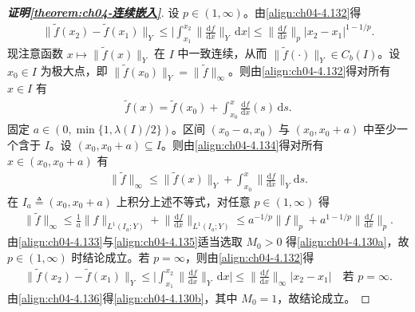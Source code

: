 \documentclass[../../main.tex]{subfiles}%
\begin{document}
\begin{proof}[\textbf{证明\cref{theorem:ch04-连续嵌入}}]
设 $p\in(1,\infty)$。由\eqref{align:ch04-4.132}得
\begin{align}
\|\tilde f(x_2)-\tilde f(x_1)\|_Y\leqslant\Big|\int_{x_1}^{x_2}\Big\|\frac{\mathrm{d}f}{\mathrm{d}x}\Big\|_Y\,\mathrm{d}x\Big|
\leqslant\Big\|\frac{\mathrm{d}f}{\mathrm{d}x}\Big\|_p|x_2-x_1|^{1-1/p}. \label{align:ch04-4.133}
\end{align}
现注意函数 $x\mapsto\|\tilde f(x)\|_Y$ 在 $I$ 中一致连续，从而 $\|\tilde f(\cdot)\|_Y\in C_b(I)$。设 $x_0\in I$ 为极大点，即 $\|\tilde f(x_0)\|_Y=\|\tilde f\|_\infty$。则由\eqref{align:ch04-4.132}得对所有 $x\in I$ 有
\begin{align}
\tilde f(x)=\tilde f(x_0)+\int_{x_0}^{x}\frac{\mathrm{d}f}{\mathrm{d}x}(s)\,\mathrm{d}s. \label{align:ch04-4.134}
\end{align}
固定 $a\in(0,\min\{1,\lambda(I)/2\})$。区间 $(x_0-a,x_0)$ 与 $(x_0,x_0+a)$ 中至少一个含于 $I$。设 $(x_0,x_0+a)\subseteq I$。则由\eqref{align:ch04-4.134}得对所有 $x\in(x_0,x_0+a)$ 有
\begin{align*}
\|\tilde f\|_\infty\leqslant\|\tilde f(x)\|_Y+\int_{x_0}^{x}\Big\|\frac{\mathrm{d}f}{\mathrm{d}x}\Big\|_Y\mathrm{d}s.
\end{align*}
在 $I_a\triangleq(x_0,x_0+a)$ 上积分上述不等式，对任意 $p\in(1,\infty)$ 得
\begin{align}
\|\tilde f\|_\infty\leqslant\frac1a\|f\|_{L^1(I_a;Y)}+\Big\|\frac{\mathrm{d}f}{\mathrm{d}x}\Big\|_{L^1(I_a;Y)}
\leqslant a^{-1/p}\|f\|_p+a^{1-1/p}\Big\|\frac{\mathrm{d}f}{\mathrm{d}x}\Big\|_p. \label{align:ch04-4.135}
\end{align}
由\eqref{align:ch04-4.133}与\eqref{align:ch04-4.135}适当选取 $M_0>0$ 得\eqref{align:ch04-4.130a}，故 $p\in(1,\infty)$ 时结论成立。若 $p=\infty$，则由\eqref{align:ch04-4.132}得
\begin{align}
\|\tilde f(x_2)-\tilde f(x_1)\|_Y\leqslant\Big|\int_{x_1}^{x_2}\Big\|\frac{\mathrm{d}f}{\mathrm{d}x}\Big\|_Y\,\mathrm{d}x\Big|
\leqslant\Big\|\frac{\mathrm{d}f}{\mathrm{d}x}\Big\|_\infty|x_2-x_1|\quad\text{若 }p=\infty. \label{align:ch04-4.136}
\end{align}
由\eqref{align:ch04-4.136}得\eqref{align:ch04-4.130b}，其中 $M_0=1$，故结论成立。
\end{proof}
\end{document}
